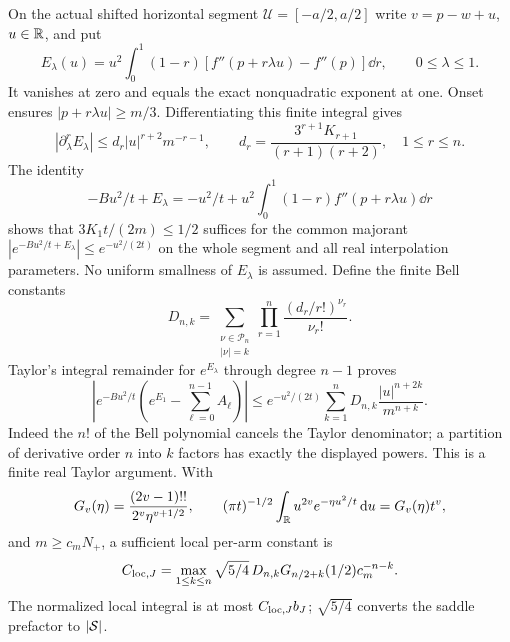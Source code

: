 On the actual shifted horizontal segment $\mathcal U=[-a/2,a/2]$
write $v=p-w+u$, $u\in\mathbb R$, and put
\begin{equation}
 E_\lambda(u)=u^2\int_0^1(1-r)
              [f''(p+r\lambda u)-f''(p)]\dd r,
 \qquad0\le\lambda\le1.
 \label{eq:positive-interpolation}
\end{equation}
It vanishes at zero and equals the exact nonquadratic exponent at
one. Onset ensures $|p+r\lambda u|\ge m/3$. Differentiating this
finite integral gives
\begin{equation}
 |\partial_\lambda^rE_\lambda|
 \le d_r|u|^{r+2}m^{-r-1},\qquad
 d_r=\frac{3^{r+1}K_{r+1}}{(r+1)(r+2)},\quad1\le r\le n.
 \label{eq:positive-interpolation-derivatives}
\end{equation}
The identity
\[
 -Bu^2/t+E_\lambda
 =-u^2/t+u^2\int_0^1(1-r)f''(p+r\lambda u)\dd r
\]
shows that $3K_1t/(2m)\le1/2$ suffices for the common majorant
$|e^{-Bu^2/t+E_\lambda}|\le e^{-u^2/(2t)}$ on the whole segment
and all real interpolation parameters. No uniform smallness of
$E_\lambda$ is assumed. Define the finite Bell constants
\begin{equation}
 D_{n,k}=\sum_{\substack{\nu\in\mathcal P_n\\|\nu|=k}}
             \prod_{r=1}^n\frac{(d_r/r!)^{\nu_r}}{\nu_r!}.
 \label{eq:positive-bell-constants}
\end{equation}
Taylor's integral remainder for $e^{E_\lambda}$ through degree
$n-1$ proves
\begin{equation}
 \left|e^{-Bu^2/t}\left(e^{E_1}-\sum_{\ell=0}^{n-1}A_\ell\right)\right|
 \le e^{-u^2/(2t)}\sum_{k=1}^nD_{n,k}
                               \frac{|u|^{n+2k}}{m^{n+k}}.
 \label{eq:positive-bell-remainder}
\end{equation}
Indeed the $n!$ of the Bell polynomial cancels the Taylor denominator;
a partition of derivative order $n$ into $k$ factors has exactly
the displayed powers. This is a finite real Taylor argument.
With
\[
 G_v(\eta)=\frac{(2v-1)!!}{2^v\eta^{v+1/2}},\qquad
 (\pi t)^{-1/2}\int_\mathbb R u^{2v}e^{-\eta u^2/t}\,\mathrm d u
 =G_v(\eta)t^v,
\]
and $m\ge c_mN_+$, a sufficient local per-arm constant is
\begin{equation}
 C_{{\rm loc},J}=\max_{1\le k\le n}
  \sqrt{5/4}\,D_{n,k}G_{n/2+k}(1/2)c_m^{-n-k}.
 \label{eq:positive-local-constant}
\end{equation}
The normalized local integral is at most $C_{{\rm loc},J}b_J$;
$\sqrt{5/4}$ converts the saddle prefactor to $|\mathcal S|$.

